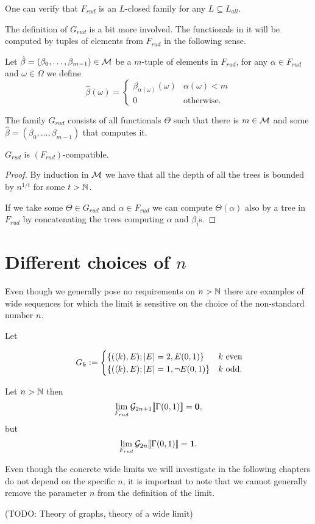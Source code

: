 One can verify that $F_{rud}$ is an $L$-closed family for any $L\subseteq L_{all}$.

The definition of $G_{rud}$ is a bit more involved. The functionals in it will be computed by tuples of elements from $F_{rud}$ in the following sense.

\begin{defi}
Let $\hat\beta=(\beta_0,\dots,\beta_{m-1})\in\mathcal{M}$ be a $m$-tuple of elements in $F_{rud}$, for any $\alpha\in F_{rud}$ and $\omega\in\Omega$ we define
\[\hat\beta(\omega)=
\begin{cases}
\beta_{\alpha(\omega)}(\omega)&\alpha(\omega)<m\\
0&\text{otherwise.}
\end{cases}\]
\end{defi}

\begin{defi}
The family $G_{rud}$ consists of all functionals $\Theta$ such that there is $m\in\mathcal{M}$ and some $\hat \beta=(\beta_0,\dots,\beta_{m-1})$ that computes it.
\end{defi}

\begin{lemm}
$G_{rud}$ is $(F_{rud})$-compatible.
\end{lemm}
\begin{proof}
By induction in $\mathcal{M}$ we have that all the depth of all the trees is bounded by $n^{1/t}$ for some $t>\mathbb{N}$.

If we take some $\Theta\in G_{rud}$ and $\alpha\in F_{rud}$ we can compute $\Theta(\alpha)$ also by a tree in $F_{rud}$ by concatenating the trees computing $\alpha$ and $\beta_i$s.
\end{proof}

\section{Different choices of $n$}

Even though we generally pose no requirements on $n>\mathbb{N}$ there are examples of wide sequences for which the limit is sensitive on the choice of the non-standard number $n$.

\begin{exam}
Let 

\[\
G_{k}:=
\begin{cases}
\{(\langle k),E);\left|{E}\right|=2,E(0,1)\}&\text{$k$ even}\\
\{(\langle k),E);\left|{E}\right|=1,\lnot E(0,1)\}&\text{$k$ odd.}\\
\end{cases}\]

Let $n>\mathbb{N}$ then
\begin{align}
\lim_{F_{rud}}\mathcal{G}_{2n+1} \llbracket \Gamma(0,1)\rrbracket =\textbf{0},
\end{align}
but
\begin{align}
\lim_{F_{rud}}\mathcal{G}_{2n}\llbracket \Gamma(0,1)\rrbracket=\textbf{1}.
\end{align}

Even though the concrete wide limits we will investigate in the following chapters do not depend on the specific $n$, it is important to note that we cannot generally remove the parameter $n$ from the definition of the limit.
\end{exam}

(TODO: Theory of graphs, theory of a wide limit)
